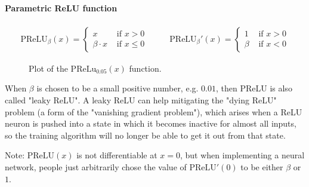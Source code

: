 \documentclass{article}
\begin{document}
        \paragraph{Parametric ReLU function}

          \begin{align*}
            \text{PReLU}_\beta (x) =
              \begin{cases}
                x & \text{ if } x > 0 \\
                \beta \cdot x & \text{ if } x \leq 0
              \end{cases}
            & \quad &
            \text{PReLU}_\beta' (x) =
              \begin{cases}
                1 & \text{ if } x > 0 \\
                \beta & \text{ if } x < 0
              \end{cases}
          \end{align*}

          \begin{figure}[!htb]
            \centering
            \caption{%
              Plot of the $\text{PReLu}_{0.05}(x)$ function.
            }
          \end{figure}

          When $\beta$ is chosen to be a small positive number, e.g. $0.01$,
          then PReLU is also called "leaky ReLU". A leaky ReLU can help
          mitigating the "dying ReLU" problem (a form of the "vanishing gradient
          problem"), which arises when a ReLU neuron is pushed into a state in
          which it becomes inactive for almost all inputs, so the training
          algorithm will no longer be able to get it out from that state.

          Note: $\text{PReLU}(x)$ is not differentiable at $x=0$, but when
          implementing a neural network, people just arbitrarily chose the value
          of $\text{PReLU}'(0)$ to be either $\beta$ or $1$.
\end{document}
